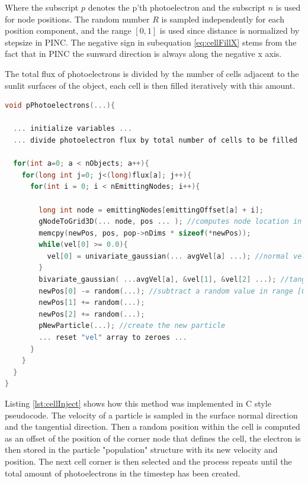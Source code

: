 Where the subscript $p$ denotes the p'th photoelectron and the subscript $n$ is used for node positions. The random number $R$ is sampled independently for each position component, and the range $[0,1]$ is used since distance is normalized by stepsize in PINC. The negative sign in subequation \eqref{eq:cellFillX} stems from the fact that in PINC the sunward direction is always along the negative x axis.

The total flux of photoelectrons is divided by the number of cells adjacent to the sunlit surfaces of the object, each cell is then filled iteratively with this amount. 

\begin{minipage}{\linewidth}
\begin{lstlisting}[language=C, caption={C style pseudocode of cell filling algorithm},
                    label={lst:cellInject}]
void pPhotoelectrons(...){

  ... initialize variables ...
  ... divide photoelectron flux by total number of cells to be filled ...

  for(int a=0; a < nObjects; a++){
    for(long int j=0; j<(long)flux[a]; j++){
      for(int i = 0; i < nEmittingNodes; i++){

        long int node = emittingNodes[emittingOffset[a] + i];
        gNodeToGrid3D(... node, pos ... ); //computes node location in grid
        memcpy(newPos, pos, pop->nDims * sizeof(*newPos));
        while(vel[0] >= 0.0){
          vel[0] = univariate_gaussian(... avgVel[a] ...); //normal velocity component
        }
        bivariate_gaussian( ...avgVel[a], &vel[1], &vel[2] ...); //tangential velocity components
        newPos[0] -= random(...); //subtract a random value in range [0,1]
        newPos[1] += random(...);
        newPos[2] += random(...);
        pNewParticle(...); //create the new particle
        ... reset "vel" array to zeroes ...
      }
    }
  }   
}
\end{lstlisting}
\end{minipage}


Listing \ref{lst:cellInject} shows how this method was implemented in C style pseudocode. The velocity of a particle is sampled in the surface normal direction and the tangential direction. Then a random position within the cell is computed as an offset of the position of the corner node that defines the cell, the electron is then stored in the particle "population" structure with its new velocity and position. The next cell corner is then selected and the process repeats until the total amount of photoelectrons in the timestep has been created.

